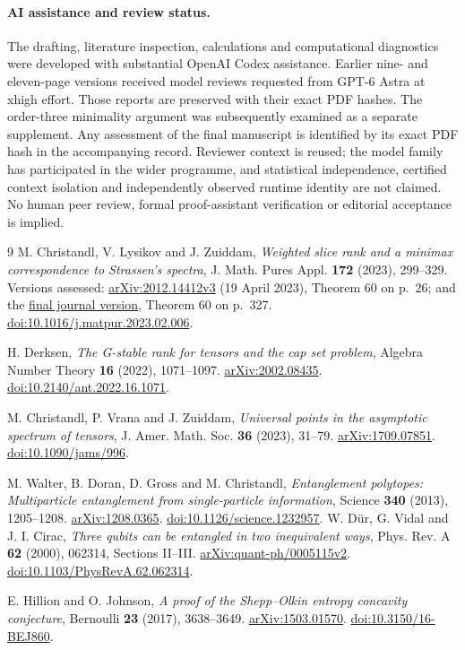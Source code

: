 \documentclass[11pt,a4paper]{article}
\begin{document}
\paragraph{AI assistance and review status.}
The drafting, literature inspection, calculations and computational
diagnostics were developed with substantial OpenAI Codex assistance.
Earlier nine- and eleven-page versions received model reviews
requested from GPT-6 Astra at xhigh effort. Those reports are
preserved with their exact PDF hashes. The order-three minimality
argument was subsequently examined as a separate supplement.
Any assessment of the final manuscript is identified by its exact
PDF hash in the accompanying record. Reviewer context is reused;
the model family has participated in the wider programme, and
statistical independence, certified context isolation and independently
observed runtime identity are not claimed. No human peer review,
formal proof-assistant verification or editorial acceptance is implied.

\begin{thebibliography}{9}
M. Christandl, V. Lysikov and J. Zuiddam,
\emph{Weighted slice rank and a minimax correspondence to Strassen's spectra},
J. Math. Pures Appl. \textbf{172} (2023), 299--329.
Versions assessed: \href{https://arxiv.org/abs/2012.14412v3}{arXiv:2012.14412v3}
(19 April 2023), Theorem 60 on p.~26; and the
\href{https://dare.uva.nl/id/5f9e575f-cd5d-4316-8f0c-9320c049778f}{final journal version},
Theorem 60 on p.~327.
\href{https://doi.org/10.1016/j.matpur.2023.02.006}{doi:10.1016/j.matpur.2023.02.006}.

H. Derksen, \emph{The G-stable rank for tensors and the cap set problem},
Algebra Number Theory \textbf{16} (2022), 1071--1097.
\href{https://arxiv.org/abs/2002.08435}{arXiv:2002.08435}.
\href{https://doi.org/10.2140/ant.2022.16.1071}{doi:10.2140/ant.2022.16.1071}.

M. Christandl, P. Vrana and J. Zuiddam,
\emph{Universal points in the asymptotic spectrum of tensors},
J. Amer. Math. Soc. \textbf{36} (2023), 31--79.
\href{https://arxiv.org/abs/1709.07851}{arXiv:1709.07851}.
\href{https://doi.org/10.1090/jams/996}{doi:10.1090/jams/996}.

M. Walter, B. Doran, D. Gross and M. Christandl,
\emph{Entanglement polytopes: Multiparticle entanglement from single-particle information},
Science \textbf{340} (2013), 1205--1208.
\href{https://arxiv.org/abs/1208.0365}{arXiv:1208.0365}.
\href{https://doi.org/10.1126/science.1232957}{doi:10.1126/science.1232957}.
W. D\"ur, G. Vidal and J. I. Cirac,
\emph{Three qubits can be entangled in two inequivalent ways},
Phys. Rev. A \textbf{62} (2000), 062314, Sections II--III.
\href{https://arxiv.org/abs/quant-ph/0005115v2}{arXiv:quant-ph/0005115v2}.
\href{https://doi.org/10.1103/PhysRevA.62.062314}{doi:10.1103/PhysRevA.62.062314}.

E. Hillion and O. Johnson,
\emph{A proof of the Shepp--Olkin entropy concavity conjecture},
Bernoulli \textbf{23} (2017), 3638--3649.
\href{https://arxiv.org/abs/1503.01570}{arXiv:1503.01570}.
\href{https://doi.org/10.3150/16-BEJ860}{doi:10.3150/16-BEJ860}.
\end{thebibliography}
\end{document}
